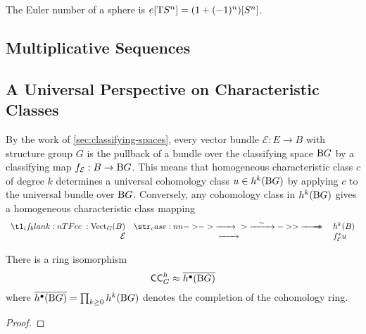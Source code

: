 \begin{corollary}
	The Euler number of a sphere is $e[\mathrm{T} S^n] = (1+(-1)^n)[S^n]$.
\end{corollary}

\subsection{Multiplicative Sequences}



\begin{definition}
\end{definition}

\subsection{A Universal Perspective on Characteristic Classes}\label{sec:universal-characteristic-classes}

By the work of \cref{sec:classifying-spaces}, every vector bundle $\mathcal{E} : E \to B$ with structure group $G$ is the pullback of a bundle over the classifying space $\mathrm{B} G$ by a classifying map $f_{\mathcal{E}} : B \to \mathrm{B} G$.
This means that homogeneous characteristic class $c$ of degree $k$ determines a universal cohomology class $u\in h^k(\mathrm{B} G)$ by applying $c$ to the universal bundle over $\mathrm{B} G$. Conversely, any cohomology class in $h^k(\mathrm{B} G)$ gives a homogeneous characteristic class mapping
\[
	\lkxfunc{c}{\Vect_G(B)}{h^k(B)}{\mathcal{E}}{f_{\mathcal{E}}^*u}
\]

\begin{proposition}
	There is a ring isomorphism
	\[
		\mathsf{CC}_G^h \approx \overline{h^\bullet(\mathrm{B} G)}
	\]
	where $\overline{h^\bullet(\mathrm{B} G)}=\prod_{k\geq 0} h^k(\mathrm{B} G)$ denotes the completion of the cohomology ring.
\end{proposition}
\begin{proof}
\end{proof}


